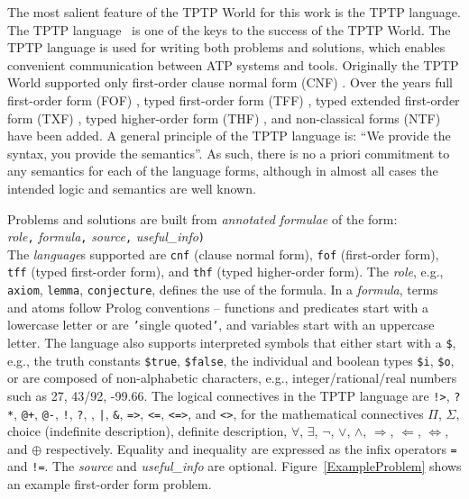 \documentclass{ceurart}
\newcommand{\smalltt}[1]{\small \texttt{#1}}
\newcommand{\tildenot}{\raisebox{0.4ex}{\texttildelow}}
\begin{document}
The most salient feature of the TPTP World for this work is the TPTP language.
The TPTP language~\cite{Sut23-IGPL} is one of the keys to the success of the TPTP World.
The TPTP language is used for writing both problems and solutions,
which enables convenient communication between ATP systems and tools.
Originally the TPTP World supported only first-order clause normal form (CNF)
\cite{SS98-JAR}.
Over the years full first-order form (FOF)
\cite{Sut09}, 
typed first-order form (TFF)
\cite{SS+12,BP13-TFF1}, 
typed extended first-order form (TXF)
\cite{SK18}, 
typed higher-order form (THF)
\cite{SB10,KSR16}, 
and non-classical forms (NTF)~\cite{SF+22} have been added.
A general principle of the TPTP language is: ``We provide the syntax, you provide the semantics''.
As such, there is no a priori commitment to any semantics for each of the language forms, 
although in almost all cases the intended logic and semantics are well known.

Problems and solutions are built from {\em annotated formulae} of the form: \\
{\em role}{\tt ,}
{\em formula}{\tt ,}
{\em source}{\tt ,}
{\em useful\_info}{\tt )} \\
The {\em language}s supported are \smalltt{cnf} (clause normal form), \smalltt{fof}
(first-order form), \smalltt{tff} (typed first-order form), and \smalltt{thf}
(typed higher-order form).
The {\em role}, e.g., \smalltt{axiom}, \smalltt{lemma}, \smalltt{conjecture}, defines the 
use of the formula.
In a {\em formula}, terms and atoms follow Prolog conventions -- functions and predicates start 
with a lowercase letter or are {\tt '}single quoted{\tt '}, and variables start with an uppercase 
letter.
The language also supports interpreted symbols that either start with a {\tt \$}, e.g., the 
truth constants \smalltt{\$true}, \smalltt{\$false}, the individual and boolean
types \smalltt{\$i}, \smalltt{\$o}, or are composed of 
non-alphabetic characters, e.g., integer/rational/real numbers such as 27, 43/92, -99.66.
The logical connectives in the TPTP language are
{\tt !>}, {\tt ?*}, {\tt @+}, {\tt @-}, {\tt !}, {\tt ?}, {\tt {\tildenot}}, {\tt |}, {\tt \&}, 
{\tt =>}, {\tt <=}, {\tt <=>}, and {\tt <{\tildenot}>}, for the mathematical connectives
$\Pi$, $\Sigma$, choice (indefinite description), definite description,
$\forall$, $\exists$, $\neg$, $\vee$, $\wedge$, $\Rightarrow$, $\Leftarrow$, $\Leftrightarrow$, 
and $\oplus$ respectively.
Equality and inequality are expressed as the infix operators {\tt =} and {\tt !=}.
The {\em source} and {\em useful\_info} are optional.
Figure~\ref{ExampleProblem} shows an example first-order form problem.
\end{document}
